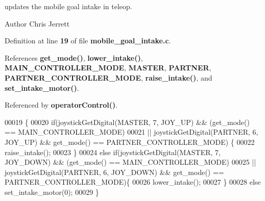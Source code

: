 updates the mobile goal intake in teleop. 

\begin{DoxyAuthor}{Author}
Chris Jerrett 
\end{DoxyAuthor}


Definition at line \textbf{ 19} of file \textbf{ mobile\+\_\+goal\+\_\+intake.\+c}.



References \textbf{ get\+\_\+mode()}, \textbf{ lower\+\_\+intake()}, \textbf{ M\+A\+I\+N\+\_\+\+C\+O\+N\+T\+R\+O\+L\+L\+E\+R\+\_\+\+M\+O\+DE}, \textbf{ M\+A\+S\+T\+ER}, \textbf{ P\+A\+R\+T\+N\+ER}, \textbf{ P\+A\+R\+T\+N\+E\+R\+\_\+\+C\+O\+N\+T\+R\+O\+L\+L\+E\+R\+\_\+\+M\+O\+DE}, \textbf{ raise\+\_\+intake()}, and \textbf{ set\+\_\+intake\+\_\+motor()}.



Referenced by \textbf{ operator\+Control()}.


\begin{DoxyCode}
00019                     \{
00020   \textcolor{keywordflow}{if}(joystickGetDigital(MASTER, 7, JOY\_UP) && (get_mode() == 
      MAIN_CONTROLLER_MODE)
00021   || joystickGetDigital(PARTNER, 6, JOY\_UP) && get_mode() == 
      PARTNER_CONTROLLER_MODE) \{
00022     raise_intake();
00023   \}
00024   \textcolor{keywordflow}{else} \textcolor{keywordflow}{if}(joystickGetDigital(MASTER, 7, JOY\_DOWN) && (get_mode() == 
      MAIN_CONTROLLER_MODE)
00025   || joystickGetDigital(PARTNER, 6, JOY\_DOWN) && get_mode() == 
      PARTNER_CONTROLLER_MODE)\{
00026     lower_intake();
00027   \}
00028   \textcolor{keywordflow}{else} set_intake_motor(0);
00029 \}
\end{DoxyCode}
